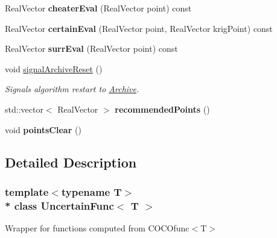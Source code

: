 \begin{DoxyCompactItemize}
\item 
Real\+Vector {\bfseries cheater\+Eval} (Real\+Vector point) const \hypertarget{classUncertainFunc_a5646bc2bda8db6b975eda4d681510733}{}\label{classUncertainFunc_a5646bc2bda8db6b975eda4d681510733}

\item 
Real\+Vector {\bfseries certain\+Eval} (Real\+Vector point, Real\+Vector krig\+Point) const \hypertarget{classUncertainFunc_ac85c9fadbc1b5d5da80ce143eed764af}{}\label{classUncertainFunc_ac85c9fadbc1b5d5da80ce143eed764af}

\item 
Real\+Vector {\bfseries surr\+Eval} (Real\+Vector point) const \hypertarget{classUncertainFunc_a6f0f1870a4338383fe717999954fe784}{}\label{classUncertainFunc_a6f0f1870a4338383fe717999954fe784}

\item 
void \hyperlink{classUncertainFunc_a8cb7fbb0a874eea4b218b6c60b44c827}{signal\+Archive\+Reset} ()\hypertarget{classUncertainFunc_a8cb7fbb0a874eea4b218b6c60b44c827}{}\label{classUncertainFunc_a8cb7fbb0a874eea4b218b6c60b44c827}

\begin{DoxyCompactList}\small\item\em Signals algorithm restart to \hyperlink{classArchive}{Archive}. \end{DoxyCompactList}\item 
std\+::vector$<$ Real\+Vector $>$ {\bfseries recommended\+Points} ()\hypertarget{classUncertainFunc_a92e7c213873cd8a62a52e2dcc2befbd7}{}\label{classUncertainFunc_a92e7c213873cd8a62a52e2dcc2befbd7}

\item 
void {\bfseries points\+Clear} ()\hypertarget{classUncertainFunc_ae882f501f1dc97ebfb0e31f8bce9e463}{}\label{classUncertainFunc_ae882f501f1dc97ebfb0e31f8bce9e463}

\end{DoxyCompactItemize}


\subsection{Detailed Description}
\subsubsection*{template$<$typename T$>$\\*
class Uncertain\+Func$<$ T $>$}

Wrapper for functions computed from C\+O\+C\+Ofunc$<$\+T$>$ 

